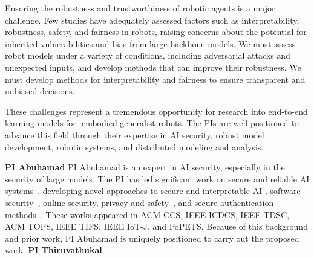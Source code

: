 {
Ensuring the robustness and trustworthiness of robotic agents is a major challenge. %
Few studies have adequately assessed factors such as interpretability, robustness, safety, and fairness in robots, raising concerns about the potential for inherited vulnerabilities and bias from large backbone models. We must assess robot models
under a variety of conditions, including adversarial attacks and unexpected inputs, and develop methods that can improve their robustness.
We must develop methods for interpretability and fairness to ensure transparent and unbiased decisions.

These challenges represent a tremendous opportunity for research into end-to-end learning models for {\xo}-embodied generalist robots. The PIs are well-positioned to advance this field through their expertise in AI security, robust model development, robotic systems, and distributed modeling and analysis.

\textbf{PI Abuhamad}
PI Abuhamad is an expert in AI security, especially in the security of large models. 
The PI has led significant work on secure and reliable AI systems~\cite{abuhamad2018large,abuhamad2020autosen,alasmary2020soteria,abuhamad2020multi,abusnaina2021dl,abuhamad2021large,abdukhamidov2023hardening,juraev2024unmasking,juraev2024impact,alawami2024motionid,abdukhamidov2024singleadv}, developing novel approaches to secure and interpretable AI \cite{abdukhamidov2023hardening,abusnaina2021dl,abdukhamidov2024singleadv,abdukhamidov2025stealthy,abuhamad2025nlp,abuhamad2025vit}, software security~\cite{abuhamad2018large,abuhamad2018large,abuhamad2020multi}, online security, privacy and safety~\cite{khan2023identification,reyes2023webtracker,shao2023lightweight,abuhamad2025shield}, and secure authentication methods~\cite{abuhamad2020autosen,alawami2024motionid}. 
These works appeared in ACM CCS, IEEE ICDCS, IEEE TDSC, ACM TOPS, IEEE TIFS, IEEE IoT-J, and PoPETS.  Because of this background and prior work, PI Abuhamad is uniquely positioned to carry out the proposed work.
\textbf{PI Thiruvathukal}

}
